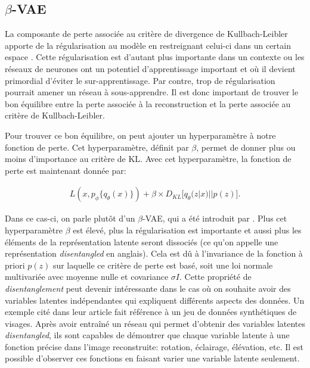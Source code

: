 \subsection{$\beta$-VAE} \label{beta-vae}

La composante de perte associée au critère de divergence de Kullbach-Leibler apporte de la régularisation au modèle en restreignant celui-ci dans un certain espace \citep{kingma2013autoencoding}. Cette régularisation est d'autant plus importante dans un contexte ou les réseaux de neurones ont un potentiel d'apprentissage important et où il devient primordial d'éviter le sur-apprentissage. Par contre, trop de régularisation pourrait amener un réseau à sous-apprendre. Il est donc important de trouver le bon équilibre entre la perte associée à la reconstruction et la perte associée au critère de Kullbach-Leibler.

Pour trouver ce bon équilibre, on peut ajouter un hyperparamètre à notre fonction de perte. Cet hyperparamètre, définit par $\beta$, permet de donner plus ou moins d'importance au critère de KL. Avec cet hyperparamètre, la fonction de perte est maintenant donnée par:

\begin{gather}  \label{eq:loss_betavae}
L(x, p_\phi\{q_\theta(x)\}) +  \beta \times D_{KL}\big[q_\theta(z|x) || p(z)\big].
\end{gather}

Dans ce cas-ci, on parle plutôt d'un $\beta$-VAE, qui a été introduit par \cite{Higgins2017betaVAELB}. Plus cet hyperparamètre $\beta$ est élevé, plus la régularisation est importante et aussi plus les éléments de la représentation latente seront dissociés (ce qu'on appelle une représentation \textit{disentangled} en anglais). Cela est dû à l'invariance de la fonction à priori $p(z)$ sur laquelle ce critère de perte est basé, soit une loi normale multivariée avec moyenne nulle et covariance $\sigma I$. Cette propriété de \textit{disentanglement} peut devenir intéressante dans le cas où on souhaite avoir des variables latentes indépendantes qui expliquent différents aspects des données. Un exemple cité dans leur article fait référence à un jeu de données synthétiques de visages. Après avoir entraîné un réseau qui permet d'obtenir des variables latentes \textit{disentangled}, ils sont capables de démontrer que chaque variable latente à une fonction précise dans l'image reconstruite: rotation, éclairage, élévation, etc. Il est possible d'observer ces fonctions en faisant varier une variable latente seulement.

